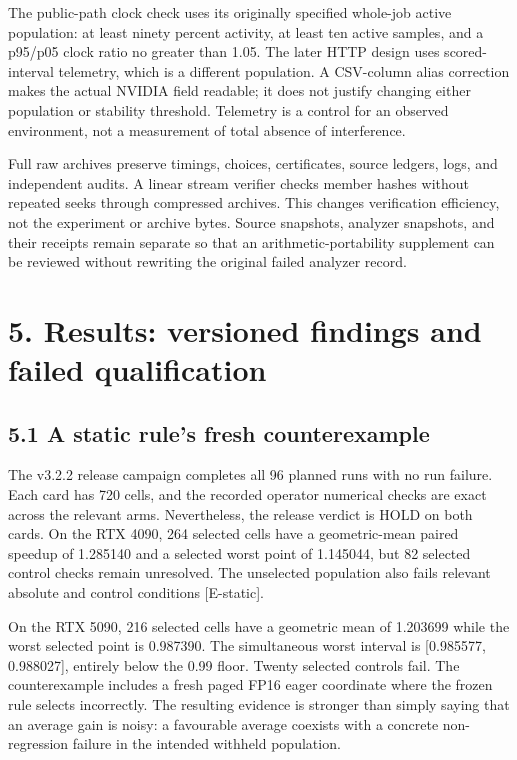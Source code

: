 \documentclass[11pt,a4paper]{article}
\begin{document}
The public-path clock check uses its originally specified whole-job active population: at least ninety percent activity, at least ten active samples, and a p95/\allowbreak{}p05 clock ratio no greater than 1.05. The later HTTP design uses scored-interval telemetry, which is a different population. A CSV-column alias correction makes the actual NVIDIA field readable; it does not justify changing either population or stability threshold. Telemetry is a control for an observed environment, not a measurement of total absence of interference.


Full raw archives preserve timings, choices, certificates, source ledgers, logs, and independent audits. A linear stream verifier checks member hashes without repeated seeks through compressed archives. This changes verification efficiency, not the experiment or archive bytes. Source snapshots, analyzer snapshots, and their receipts remain separate so that an arithmetic-portability supplement can be reviewed without rewriting the original failed analyzer record.


\clearpage

\section*{5. Results: versioned findings and failed qualification}


\subsection*{5.1 A static rule's fresh counterexample}

The v3.2.2 release campaign completes all 96 planned runs with no run failure. Each card has 720 cells, and the recorded operator numerical checks are exact across the relevant arms. Nevertheless, the release verdict is HOLD on both cards. On the RTX 4090, 264 selected cells have a geometric-mean paired speedup of 1.285140 and a selected worst point of 1.145044, but 82 selected control checks remain unresolved. The unselected population also fails relevant absolute and control conditions [E-static].


On the RTX 5090, 216 selected cells have a geometric mean of 1.203699 while the worst selected point is 0.987390. The simultaneous worst interval is [0.985577, 0.988027], entirely below the 0.99 floor. Twenty selected controls fail. The counterexample includes a fresh paged FP16 eager coordinate where the frozen rule selects incorrectly. The resulting evidence is stronger than simply saying that an average gain is noisy: a favourable average coexists with a concrete non-regression failure in the intended withheld population.
\end{document}
